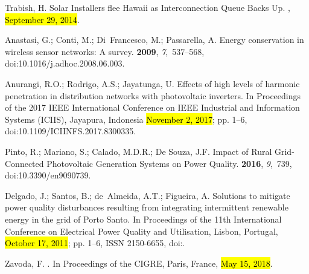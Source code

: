 \documentclass[energies,article,accept,moreauthors,pdftex]{Definitions/mdpi}
\begin{document}
\begin{thebibliography}{999}
\providecommand{\natexlab}[1]{#1}


Trabish, H.
\newblock Solar Installers flee {Hawaii} as Interconnection Queue Backs Up.
, {\hl{September 29, 2014}}.%

Anastasi, G.; Conti, M.; Di~Francesco, M.; Passarella, A.
\newblock Energy conservation in wireless sensor networks: {A} survey.
 {\bf 2009}, {\em 7},~537--568, doi:10.1016/j.adhoc.2008.06.003.

Anurangi, R.O.; Rodrigo, A.S.; Jayatunga, U.
\newblock Effects of high levels of harmonic penetration in distribution
networks with photovoltaic inverters.
\newblock In {Proceedings of the } 2017 {IEEE} {International} {Conference} on IEEE Industrial and {Information} {Systems} ({ICIIS}), Jayapura, Indonesia \hl{November 2, 2017}; pp. 1--6, doi:10.1109/ICIINFS.2017.8300335.%

Pinto, R.; Mariano, S.; Calado, M.D.R.;  De Souza, J.F.
\newblock Impact of {Rural} {Grid}-{Connected} {Photovoltaic} {Generation}
{Systems} on {Power} {Quality}.
 {\bf 2016}, {\em 9},~739, doi:10.3390/en9090739.

Delgado, J.; Santos, B.; de~Almeida, A.T.; Figueira, A.
\newblock Solutions to mitigate power quality disturbances resulting from
integrating intermittent renewable energy in the grid of {Porto} {Santo}.
\newblock In {Proceedings of the } 11th {International} {Conference} on {Electrical} {Power} {Quality}
and {Utilisation}, Lisbon, Portugal, \hl{October 17, 2011}; pp. 1--6,
\newblock ISSN 2150-6655,
doi:{\href{https://doi.org/10.1109/EPQU.2011.6128870}{}}.

Zavoda, F.
. In {Proceedings of the } CIGRE, Paris, France, \hl{May 15, 2018}.


\end{thebibliography}
\end{document}

